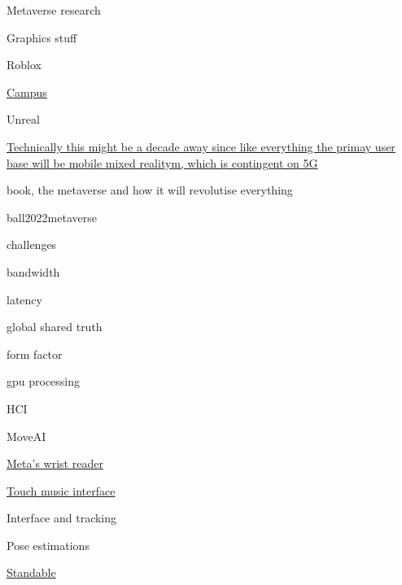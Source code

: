    
 
  Metaverse research

   
  \tightlist
   
    Graphics stuff

     
    \tightlist
     
      Roblox

       
      \tightlist
       
        \href{https://techcrunch-com.cdn.ampproject.org/c/s/techcrunch.com/2022/09/09/roblox-rdc-2022/amp/}{Campus}
       
     
      Unreal
     
      \href{https://www.matthewball.vc/all/forwardtothemetaverseprimer}{Technically
      this might be a decade away since like everything the primay user
      base will be mobile mixed realitym, which is contingent on 5G}

       
      \tightlist
       
        book, the metaverse and how it will revolutise everything
       
        ball2022metaverse
       
        challenges

         
        \tightlist
         
          bandwidth
         
          latency
         
          global shared truth
         
          form factor
         
          gpu processing
         
       
     
   
    HCI

     
    \tightlist
     
      MoveAI
     
      \href{https://www.from-the-interface.com/wrist-interfaces/}{Meta's
      wrist reader}
     
      \href{https://scitechdaily.com/groundbreaking-new-technology-allows-people-to-listen-to-music-through-touch/}{Touch
      music interface}
     
      Interface and tracking

       
      \tightlist
       
        Pose estimations

         
        \tightlist
         
          \href{https://www.standablevr.com/}{Standable}
         
